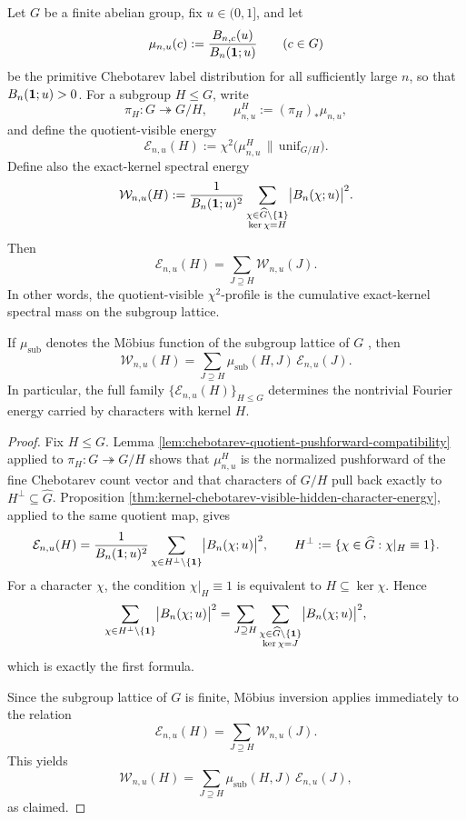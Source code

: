 \begin{theorem}\label{thm:kernel-chebotarev-quotient-lattice-tomography}
Let \(G\) be a finite abelian group, fix \(u\in(0,1]\), and let
\[
\mu_{n,u}(c):=\frac{B_{n,c}(u)}{B_n(\mathbf{1};u)}
\qquad(c\in G)
\]
be the primitive Chebotarev label distribution for all sufficiently large \(n\), so that \(B_n(\mathbf{1};u)>0\). For a subgroup \(H\le G\), write
\[
\pi_H:G\twoheadrightarrow G/H,
\qquad
\mu_{n,u}^H:=(\pi_H)_\ast\mu_{n,u},
\]
and define the quotient-visible energy
\[
\mathcal E_{n,u}(H)
:=
\chi^2\!\bigl(\mu_{n,u}^H\,\|\,\mathrm{unif}_{G/H}\bigr).
\]
Define also the exact-kernel spectral energy
\[
\mathcal W_{n,u}(H)
:=
\frac{1}{B_n(\mathbf{1};u)^2}
\sum_{\substack{\chi\in\widehat G\setminus\{\mathbf{1}\}\\ \ker\chi=H}}
\bigl|B_n(\chi;u)\bigr|^2.
\]
Then
\[
\mathcal E_{n,u}(H)=\sum_{J\supseteq H}\mathcal W_{n,u}(J).
\]
In other words, the quotient-visible \(\chi^2\)-profile is the cumulative exact-kernel spectral mass on the subgroup lattice.

If \(\mu_{\mathrm{sub}}\) denotes the Möbius function of the subgroup lattice of \(G\) \cite{Rota1964}, then
\[
\mathcal W_{n,u}(H)
=
\sum_{J\supseteq H}\mu_{\mathrm{sub}}(H,J)\,\mathcal E_{n,u}(J).
\]
In particular, the full family \(\{\mathcal E_{n,u}(H)\}_{H\le G}\) determines the nontrivial Fourier energy carried by characters with kernel \(H\).
\end{theorem}

\begin{proof}
Fix \(H\le G\). Lemma \ref{lem:chebotarev-quotient-pushforward-compatibility} applied to \(\pi_H:G\twoheadrightarrow G/H\) shows that \(\mu_{n,u}^H\) is the normalized pushforward of the fine Chebotarev count vector and that characters of \(G/H\) pull back exactly to \(H^\perp\subseteq\widehat G\). Proposition \ref{thm:kernel-chebotarev-visible-hidden-character-energy}, applied to the same quotient map, gives
\[
\mathcal E_{n,u}(H)
=
\frac{1}{B_n(\mathbf{1};u)^2}
\sum_{\chi\in H^\perp\setminus\{\mathbf{1}\}}
\bigl|B_n(\chi;u)\bigr|^2,
\qquad
H^\perp:=\{\chi\in\widehat G:\chi|_H\equiv 1\}.
\]
For a character \(\chi\), the condition \(\chi|_H\equiv 1\) is equivalent to \(H\subseteq\ker\chi\). Hence
\[
\sum_{\chi\in H^\perp\setminus\{\mathbf{1}\}}
\bigl|B_n(\chi;u)\bigr|^2
=
\sum_{J\supseteq H}
\sum_{\substack{\chi\in\widehat G\setminus\{\mathbf{1}\}\\ \ker\chi=J}}
\bigl|B_n(\chi;u)\bigr|^2,
\]
which is exactly the first formula.

Since the subgroup lattice of \(G\) is finite, Möbius inversion applies immediately to the relation
\[
\mathcal E_{n,u}(H)=\sum_{J\supseteq H}\mathcal W_{n,u}(J).
\]
This yields
\[
\mathcal W_{n,u}(H)
=
\sum_{J\supseteq H}\mu_{\mathrm{sub}}(H,J)\,\mathcal E_{n,u}(J),
\]
as claimed.
\end{proof}

